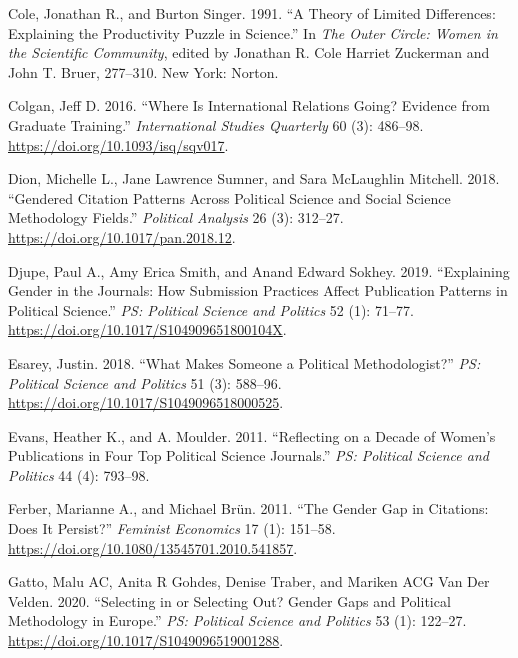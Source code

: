 \documentclass[
]{ccr}
\newlength{\cslhangindent}
\newlength{\cslentryspacingunit} %
\newenvironment{CSLReferences}[2] %
 {%
  \setlength{\parindent}{0pt}
  \ifodd #1
  \let\oldpar\par
  \def\par{\hangindent=\cslhangindent\oldpar}
  \fi
  \setlength{\parskip}{#2\cslentryspacingunit}
 }%
 {}
\begin{document}
\begin{CSLReferences}{1}{0}
\leavevmode{}%
Cole, Jonathan R., and Burton Singer. 1991. {``A {Theory} of {Limited}
{Differences}: {Explaining} the {Productivity} {Puzzle} in {Science}.''}
In \emph{The {Outer} {Circle}: {Women} in the {Scientific} {Community}},
edited by Jonathan R. Cole Harriet Zuckerman and John T. Bruer,
277--310. New York: Norton.

\leavevmode{}%
Colgan, Jeff D. 2016. {``Where {Is} {International} {Relations} {Going}?
{Evidence} from {Graduate} {Training}.''} \emph{International Studies
Quarterly} 60 (3): 486--98. \url{https://doi.org/10.1093/isq/sqv017}.

\leavevmode{}%
Dion, Michelle L., Jane Lawrence Sumner, and Sara McLaughlin Mitchell.
2018. {``Gendered {Citation} {Patterns} Across {Political} {Science} and
{Social} {Science} {Methodology} {Fields}.''} \emph{Political Analysis}
26 (3): 312--27. \url{https://doi.org/10.1017/pan.2018.12}.

\leavevmode{}%
Djupe, Paul A., Amy Erica Smith, and Anand Edward Sokhey. 2019.
{``Explaining {Gender} in the {Journals}: {How} {Submission} {Practices}
{Affect} {Publication} {Patterns} in {Political} {Science}.''} \emph{PS:
Political Science and Politics} 52 (1): 71--77.
\url{https://doi.org/10.1017/S104909651800104X}.

\leavevmode{}%
Esarey, Justin. 2018. {``What {Makes} {Someone} a {Political}
{Methodologist}?''} \emph{PS: Political Science and Politics} 51 (3):
588--96. \url{https://doi.org/10.1017/S1049096518000525}.

\leavevmode{}%
Evans, Heather K., and A. Moulder. 2011. {``Reflecting on a {Decade} of
{Women}'s {Publications} in {Four} {Top} {Political} {Science}
{Journals}.''} \emph{PS: Political Science and Politics} 44 (4):
793--98.

\leavevmode{}%
Ferber, Marianne A., and Michael Brün. 2011. {``The {Gender} {Gap} in
{Citations}: {Does} {It} {Persist}?''} \emph{Feminist Economics} 17 (1):
151--58. \url{https://doi.org/10.1080/13545701.2010.541857}.

\leavevmode{}%
Gatto, Malu AC, Anita R Gohdes, Denise Traber, and Mariken ACG Van Der
Velden. 2020. {``Selecting in or {Selecting} {Out}? {Gender} {Gaps} and
{Political} {Methodology} in {Europe}.''} \emph{PS: Political Science
and Politics} 53 (1): 122--27.
\url{https://doi.org/10.1017/S1049096519001288}.


\end{CSLReferences}
\end{document}
